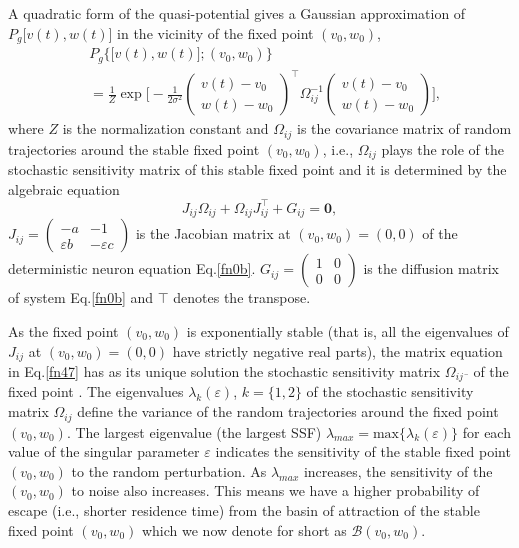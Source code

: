 A quadratic form of the quasi-potential gives a Gaussian
approximation of $P_g\big[v(t),w(t)\big]$ in the vicinity of the
fixed point $(v_0,w_0)$,
\begin{align}\label{fn46}\nonumber
&P_g\Big\{\big[v(t),w(t)\big];(v_0,w_0)\Big\}\\&=\frac{1}{Z}
\exp\Bigg[-\frac{1}{2\sigma^2} \left(\begin{array}{c}
 v(t)-v_0\\w(t)-w_0 
\end{array}\right)^{\top}\Omega_{ij}^{-1}
\left(\begin{array}{c}
 v(t)-v_0\\w(t)-w_0 
\end{array}\right)\Bigg],
\end{align}
where $Z$ is the normalization constant and $\Omega_{ij}$ is
the covariance matrix of random trajectories around the stable fixed
point $(v_0,w_0)$, i.e., $\Omega_{ij}$ plays the role of the
stochastic sensitivity matrix of this stable fixed point and it is
determined by the algebraic equation \begin{equation}\label{fn47}
J_{ij}\Omega_{ij}+\Omega_{ij}J_{ij}^{\top}+G_{ij}=\textbf{0}, \end{equation}
$J_{ij}=\left( \begin{array}{cc} -a & -1\\
\varepsilon b & -\varepsilon c \end{array} \right)$ is the
Jacobian matrix at $(v_0,w_0)=(0,0)$ of the deterministic neuron
equation Eq.\eqref{fn0b}.
$G_{ij}=\left( \begin{array}{cc} 1 & 0\\
0 & 0 \end{array} \right)$ is the diffusion matrix of system
Eq.\eqref{fn0b} and $\top$ denotes the transpose.

As the fixed point $(v_0,w_0)$ is exponentially stable (that is, all
the eigenvalues of $J_{ij}$ at $(v_0,w_0)=(0,0)$ have strictly
negative real parts), the matrix equation in Eq.\eqref{fn47} has as its 
unique solution  the stochastic sensitivity matrix
$\Omega_{ij}\overline{}$ of the fixed point \cite{Bashkirtseva1}.
The eigenvalues $\lambda_k(\varepsilon)$, $k=\{1,2\}$ of the
stochastic sensitivity matrix $\Omega_{ij}$ define the variance
of the random trajectories around the fixed point $(v_0,w_0)$. The
largest eigenvalue (the largest SSF)
$\lambda_{max}=\text{max}\{\lambda_k(\varepsilon)\}$ for each
value of the singular parameter $\varepsilon$ indicates the
sensitivity of the stable fixed point $(v_0,w_0)$ to the random
perturbation. As $\lambda_{max}$ increases,
the sensitivity of the $(v_0,w_0)$ to noise also increases. This
means we have a higher probability of escape (i.e., shorter
residence time) from the basin of attraction of the stable fixed
point $(v_0,w_0)$ which we now denote for short as
$\mathcal{B}(v_0,w_0)$.

